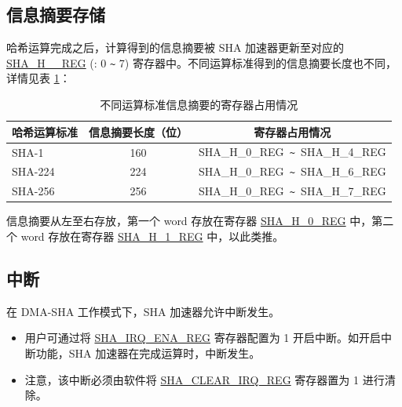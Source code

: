 \documentclass[main\_\_CN.tex]{subfiles}
\begin{document}
\subsection{信息摘要存储}

哈希运算完成之后，计算得到的信息摘要被 SHA 加速器更新至对应的 \hyperref[regdesc:SHAHNREG]{SHA\_H\_\_REG} (: 0 \verb+~+ 7) 寄存器中。不同运算标准得到的信息摘要长度也不同，详情见表 \ref{tab:sha-message-digest}：


\begin{table}[H]
    \centering
    \caption{不同运算标准信息摘要的寄存器占用情况}
    \label{tab:sha-message-digest}
    \begin{threeparttable}
    \begin{tabular}{ | l | c | c |}
    \hline
        \rowcolor{lightgray}
        \textbf{哈希运算标准} & \textbf{信息摘要长度（位）} & \textbf{寄存器占用情况\tnote{1}} \\\hline
        SHA-1 & 160 & SHA\_H\_0\_REG\verb+ ~ +SHA\_H\_4\_REG \\\hline
        SHA-224 & 224 & SHA\_H\_0\_REG\verb+ ~ +SHA\_H\_6\_REG \\\hline  
        SHA-256 & 256 & SHA\_H\_0\_REG\verb+ ~ +SHA\_H\_7\_REG \\\hline
    \end{tabular}

    \begin{tablenotes}
        \item[1] 信息摘要从左至右存放，第一个 word 存放在寄存器 \hyperref[regdesc:SHAHNREG]{SHA\_H\_0\_REG} 中，第二个 word 存放在寄存器 \hyperref[regdesc:SHAHNREG]{SHA\_H\_1\_REG} 中，以此类推。
    \end{tablenotes}

    \end{threeparttable}
\end{table}

\subsection{中断}\label{sec:sha-Interrupt}

在 DMA-SHA 工作模式下，SHA 加速器允许中断发生。
\begin{itemize}
    \item 用户可通过将 \hyperref[regdesc:SHAIRQENAREG]{SHA\_IRQ\_ENA\_REG} 寄存器配置为 1 开启中断。如开启中断功能，SHA 加速器在完成运算时，中断发生。
    \item 注意，该中断必须由软件将 \hyperref[regdesc:SHACLEARIRQREG]{SHA\_CLEAR\_IRQ\_REG} 寄存器置为 1 进行清除。
\end{itemize} 
\end{document}
